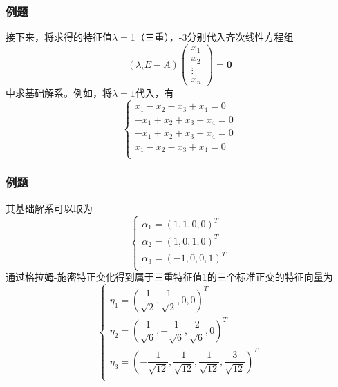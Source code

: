 
\begin{frame}
\frametitle{例题}

接下来，将求得的特征值$\lambda = $1（三重），-3分别代入齐次线性方程组
\[\left( \lambda_i E - A \right) \begin{pmatrix} x_1 \\ x_2 \\ \vdots \\ x_n \end{pmatrix} = \mathbf{0}\]
中求基础解系。例如，将$\lambda = 1$代入，有
\[\begin{cases}
x_1 - x_2 - x_3 + x_4 = 0 \\
-x_1 + x_2 + x_3 - x_4 = 0 \\
-x_1 + x_2 + x_3 - x_4 = 0 \\
x_1 - x_2 - x_3 + x_4 = 0 \\
\end{cases}\]

\end{frame}


\begin{frame}
\frametitle{例题}

其基础解系可以取为
\[\begin{cases}
\alpha_1 = (1,1,0,0)^T \\
\alpha_2 = (1,0,1,0)^T \\
\alpha_3 = (-1,0,0,1)^T \\
\end{cases}\]
通过格拉姆-施密特正交化得到属于三重特征值1的三个标准正交的特征向量为
\[\begin{cases}
\eta_1 = \left(\dfrac{1}{\sqrt{2}},\dfrac{1}{\sqrt{2}},0,0 \right)^T \\
\eta_2 = \left(\dfrac{1}{\sqrt{6}},-\dfrac{1}{\sqrt{6}},\dfrac{2}{\sqrt{6}},0 \right)^T \\
\eta_3 = \left(-\dfrac{1}{\sqrt{12}},\dfrac{1}{\sqrt{12}},\dfrac{1}{\sqrt{12}},\dfrac{3}{\sqrt{12}} \right)^T \\
\end{cases}\]

\end{frame}



